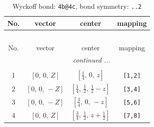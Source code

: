 \documentclass[fleqn,8pt]{jsarticle}
\begin{document}
\renewcommand{\arraystretch}{1.2}
\begin{longtable}{cccc}
\caption{Wyckoff bond: {\tt 4b@4c}, bond symmetry: {\tt ..2}}
 \\
 \hline \hline
No. & vector & center & mapping \\ \hline \endfirsthead

\multicolumn{3}{l}{\tablename\ \thetable{}} \\
 \hline \hline
No. & vector & center & mapping \\ \hline \endhead

 \hline \hline
\multicolumn{3}{r}{\footnotesize\it continued ...} \\ \endfoot

 \hline \hline
\multicolumn{3}{r}{} \\ \endlastfoot

1 & $\left[ 0,\, 0,\, Z \right]$ & $\left[ \frac{1}{4},\, 0,\, z \right]$ & {\tt [1,2]} \\ \hline
2 & $\left[ 0,\, 0,\, - Z \right]$ & $\left[ \frac{1}{4},\, \frac{1}{2},\, \frac{1}{2} - z \right]$ & {\tt [3,4]} \\ \hline
3 & $\left[ 0,\, 0,\, - Z \right]$ & $\left[ \frac{3}{4},\, 0,\, - z \right]$ & {\tt [5,6]} \\ \hline
4 & $\left[ 0,\, 0,\, Z \right]$ & $\left[ \frac{3}{4},\, \frac{1}{2},\, z + \frac{1}{2} \right]$ & {\tt [7,8]} \\
\end{longtable}
\renewcommand{\arraystretch}{1.2}
\end{document}
